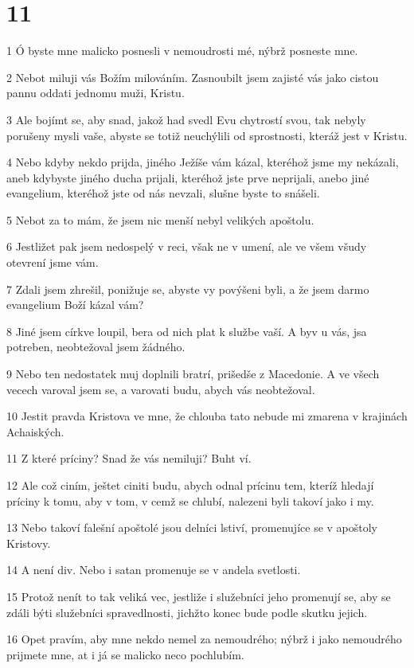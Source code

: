 \chapter{11}

\par 1 Ó byste mne malicko posnesli v nemoudrosti mé, nýbrž posneste mne.
\par 2 Nebot miluji vás Božím milováním. Zasnoubilt jsem zajisté vás jako cistou pannu oddati jednomu muži, Kristu.
\par 3 Ale bojímt se, aby snad, jakož had svedl Evu chytrostí svou, tak nebyly porušeny mysli vaše, abyste se totiž neuchýlili od sprostnosti, kteráž jest v Kristu.
\par 4 Nebo kdyby nekdo prijda, jiného Ježíše vám kázal, kteréhož jsme my nekázali, aneb kdybyste jiného ducha prijali, kteréhož jste prve neprijali, anebo jiné evangelium, kteréhož jste od nás nevzali, slušne byste to snášeli.
\par 5 Nebot za to mám, že jsem nic menší nebyl velikých apoštolu.
\par 6 Jestližet pak jsem nedospelý v reci, však ne v umení, ale ve všem všudy otevrení jsme vám.
\par 7 Zdali jsem zhrešil, ponižuje se, abyste vy povýšeni byli, a že jsem darmo evangelium Boží kázal vám?
\par 8 Jiné jsem církve loupil, bera od nich plat k službe vaší. A byv u vás, jsa potreben, neobtežoval jsem žádného.
\par 9 Nebo ten nedostatek muj doplnili bratrí, prišedše z Macedonie. A ve všech vecech varoval jsem se, a varovati budu, abych vás neobtežoval.
\par 10 Jestit pravda Kristova ve mne, že chlouba tato nebude mi zmarena v krajinách Achaiských.
\par 11 Z které príciny? Snad že vás nemiluji? Buht ví.
\par 12 Ale což ciním, ještet ciniti budu, abych odnal prícinu tem, kteríž hledají príciny k tomu, aby v tom, v cemž se chlubí, nalezeni byli takoví jako i my.
\par 13 Nebo takoví falešní apoštolé jsou delníci lstiví, promenujíce se v apoštoly Kristovy.
\par 14 A není div. Nebo i satan promenuje se v andela svetlosti.
\par 15 Protož nenít to tak veliká vec, jestliže i služebníci jeho promenují se, aby se zdáli býti služebníci spravedlnosti, jichžto konec bude podle skutku jejich.
\par 16 Opet pravím, aby mne nekdo nemel za nemoudrého; nýbrž i jako nemoudrého prijmete mne, at i já se malicko neco pochlubím.
